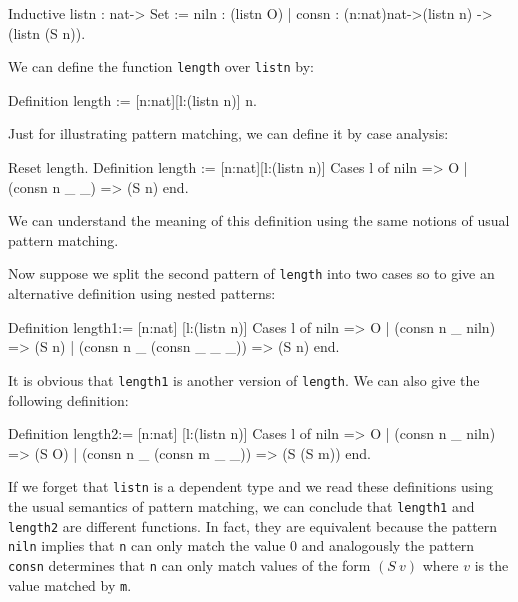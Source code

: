 \begin{coq_example}
Inductive listn : nat-> Set := 
  niln : (listn O) 
| consn : (n:nat)nat->(listn n) -> (listn (S n)).
\end{coq_example}

We can define the function \texttt{length} over \texttt{listn} by:

\begin{coq_example}
Definition length := [n:nat][l:(listn n)] n.
\end{coq_example}

Just for illustrating pattern matching, 
we can define it by case analysis:

\begin{coq_example}
Reset length.
Definition length := [n:nat][l:(listn n)]
                      Cases l of  
                         niln         => O 
                      | (consn n _ _) => (S n) 
                      end.
\end{coq_example}

We can understand the meaning of this definition using the
same notions of usual pattern matching.

%
%
\iffalse
Now suppose we split the second pattern  of \texttt{length} into two 
cases so to give an
alternative definition using nested patterns:
\begin{coq_example}
Definition length1:= [n:nat] [l:(listn n)]
   Cases l of 
        niln                   => O
   | (consn n _ niln)          => (S n)
   | (consn n _ (consn _ _ _)) => (S n)
  end.
\end{coq_example}

It is obvious that \texttt{length1} is  another version of
\texttt{length}. We can also give the following definition:
\begin{coq_example}
Definition length2:= [n:nat] [l:(listn n)]
 Cases l of 
     niln                    => O
 | (consn n _ niln)          => (S O)
 | (consn n _ (consn m _ _)) => (S (S m))
 end.
\end{coq_example}

If we forget that \texttt{listn} is a dependent type and we read these
definitions using the usual semantics of pattern matching,  we can conclude
that \texttt{length1}
and \texttt{length2} are different functions.
In fact, they are equivalent
because the pattern \texttt{niln} implies that \texttt{n} can only match
the value $0$ and analogously the pattern \texttt{consn} determines that \texttt{n} can
only match  values of the form  $(S~v)$ where $v$ is the value matched by
\texttt{m}. 

